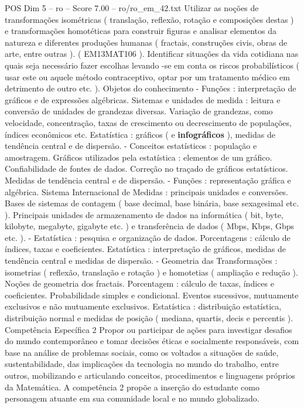 \begin{textsample}{POS Dim 5 – ro – Score 7.00 – ro/ro\_em\_42.txt}
Utilizar as noções de transformações isométricas ( translação, reflexão, rotação e composições destas ) e transformações homotéticas para construir figuras e analisar elementos da natureza e diferentes produções humanas ( fractais, construções civis, obras de arte, entre outras ). ( EM13MAT106 ).
Identificar situações da vida cotidiana nas quais seja necessário fazer escolhas levando -se em conta os riscos probabilísticos ( usar este ou aquele método contraceptivo, optar por um tratamento médico em detrimento de outro etc. ).
Objetos do conhecimento - Funções : interpretação de gráficos e de expressões algébricas.
Sistemas e unidades de medida : leitura e conversão de unidades de grandezas diversas.
Variação de grandezas, como velocidade, concentração, taxas de crescimento ou decrescimento de populações, índices econômicos etc.
Estatística : gráficos ( e \textbf{infográficos} ), medidas de tendência central e de dispersão. - Conceitos estatísticos : população e amostragem.
Gráficos utilizados pela estatística : elementos de um gráfico.
Confiabilidade de fontes de dados.
Correção no traçado de gráficos estatísticos.
Medidas de tendência central e de dispersão. - Funções : representação gráfica e algébrica.
Sistema Internacional de Medidas : principais unidades e conversões.
Bases de sistemas de contagem ( base decimal, base binária, base sexagesimal etc. ).
Principais unidades de armazenamento de dados na informática ( bit, byte, kilobyte, megabyte, gigabyte etc. ) e transferência de dados ( Mbps, Kbps, Gbps etc. ). - Estatística : pesquisa e organização de dados.
Porcentagens : cálculo de índices, taxas e coeficientes.
Estatística : interpretação de gráficos, medidas de tendência central e medidas de dispersão. - Geometria das Transformações : isometrias ( reflexão, translação e rotação ) e homotetias ( ampliação e redução ).
Noções de geometria dos fractais.
Porcentagem : cálculo de taxas, índices e coeficientes.
Probabilidade simples e condicional.
Eventos sucessivos, mutuamente exclusivos e não mutuamente exclusivos.
Estatística : distribuição estatística, distribuição normal e medidas de posição ( mediana, quartis, decis e percentis ).
Competência Específica 2 Propor ou participar de ações para investigar desafios do mundo contemporâneo e tomar decisões éticas e socialmente responsáveis, com base na análise de problemas sociais, como os voltados a situações de saúde, sustentabilidade, das implicações da tecnologia no mundo do trabalho, entre outros, mobilizando e articulando conceitos, procedimentos e linguagens próprios da Matemática.
A competência 2 propõe a inserção do estudante como personagem atuante em sua comunidade local e no mundo globalizado.

\end{textsample}
